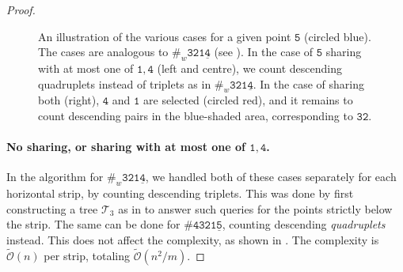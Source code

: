 \documentclass{article}
\newcommand{\pce}[1]{{\# \mathtt{#1} }}
\newcommand{\pcwe}[1]{{\#_w \mathtt{ #1 } }}
\theoremstyle{remark}
\newcommand{\Otilde}[1]{\widetilde{\mathcal{O}}\left( #1 \right)}
\theoremstyle{plain}
\begin{document}
\begin{proof}
\begin{figure}[ht]
    
    \vspace{-0.1in}
    \caption{An illustration of the various cases for a given point $\mathtt{5}$ (circled blue). The cases are analogous to $\pcwe{321\underline{4}}$ (see ). In the case of $\mathtt{5}$ sharing with at most one of $\mathtt{1},\mathtt{4}$ (left and centre), we count descending quadruplets instead of triplets as in $\pcwe{321\underline{4}}$. In the case of sharing both (right),  $\mathtt{4}$ and $\mathtt{1}$ are selected (circled red), and it remains to count descending pairs in the blue-shaded area, corresponding to $\mathtt{32}$.}
    \label{fig:43215}
\end{figure}

\paragraph{No sharing, or sharing with at most one of $\mathtt{1},\mathtt{4}$.}
In the algorithm for $\pcwe{321\underline{4}}$,
we handled both of these cases separately for each horizontal strip, by counting descending triplets.
This was done by first constructing a tree $\mathcal{T}_3$ as in 
to answer such queries for the points strictly below the strip. 
The same can be done for $\pce{4321\underline{5}}$, counting descending \textit{quadruplets} instead.
This does not affect the complexity, as shown in .
The complexity is $\Otilde{n}$ per strip, totaling $\Otilde{n^2/m}$.


\end{proof}
\end{document}
